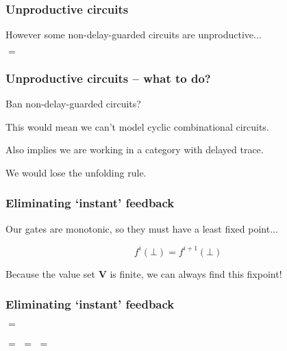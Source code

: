 \begin{frame}
    \frametitle{Unproductive circuits}

    However some non-delay-guarded circuits \alert{are} unproductive...

    \begin{center}
        \pause
        \pause
        \quad\(=\)\quad

    \end{center}

\end{frame}

\begin{frame}
    \frametitle{Unproductive circuits -- what to do?}

    Ban non-delay-guarded circuits?

    \pause

    This would mean we can't model cyclic combinational circuits.

    \pause

    Also implies we are working in a category with \alert{delayed trace}.
    
    \pause

    We would lose the \alert{unfolding} rule.

\end{frame}

\begin{frame}
    \frametitle{Eliminating `instant' feedback}

    \pause

    Our gates are \alert{monotonic}, so they must have a \alert{least fixed point}...
    
    \[f^i(\bot) = f^{i+1}(\bot)\]

    \pause

    Because the value set \(\textbf{V}\) is finite, we can always find this fixpoint!    
    
\end{frame}

\begin{frame}
    \frametitle{Eliminating `instant' feedback}

    
    \begin{center}
        \pause
        \quad\(=\)\quad

        \vspace{1em}

        \pause
        \quad\(=\)\quad
        \pause
        \quad\(=\)\quad
        \pause
        \quad\(=\)\quad
    \end{center}


\end{frame}

